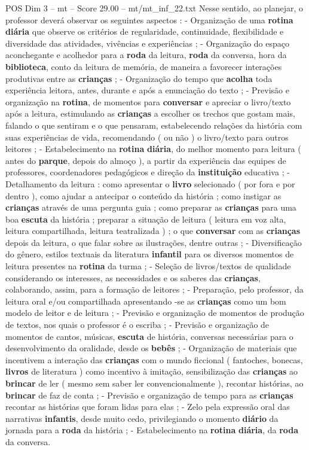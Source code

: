 \begin{textsample}{POS Dim 3 – mt – Score 29.00 – mt/mt\_inf\_22.txt}
Nesse sentido, ao planejar, o professor deverá observar os seguintes aspectos : - Organização de uma \textbf{rotina} \textbf{diária} que observe os critérios de regularidade, continuidade, flexibilidade e diversidade das atividades, vivências e experiências ; - Organização do espaço aconchegante e acolhedor para a \textbf{roda} da leitura, \textbf{roda} da conversa, hora da \textbf{biblioteca}, conto da leitura de memória, de maneira a favorecer interações produtivas entre as \textbf{crianças} ; - Organização do tempo que \textbf{acolha} toda experiência leitora, antes, durante e após a enunciação do texto ; - Previsão e organização na \textbf{rotina}, de momentos para \textbf{conversar} e apreciar o livro/texto após a leitura, estimulando as \textbf{crianças} a escolher os trechos que gostam mais, falando o que sentiram e o que pensaram, estabelecendo relações da história com suas experiências de vida, recomendando ( ou não ) o livro/texto para outros leitores ; - Estabelecimento na \textbf{rotina} \textbf{diária}, do melhor momento para leitura ( antes do \textbf{parque}, depois do almoço ), a partir da experiência das equipes de professores, coordenadores pedagógicos e direção da \textbf{instituição} educativa ; - Detalhamento da leitura : como apresentar o \textbf{livro} selecionado ( por fora e por dentro ), como ajudar a antecipar o conteúdo da história ; como instigar as \textbf{crianças} através de uma pergunta guia ; como preparar as \textbf{crianças} para uma boa \textbf{escuta} da história ; preparar a situação de leitura ( leitura em voz alta, leitura compartilhada, leitura teatralizada ) ; o que \textbf{conversar} com as \textbf{crianças} depois da leitura, o que falar sobre as ilustrações, dentre outras ; - Diversificação do gênero, estilos textuais da literatura \textbf{infantil} para os diversos momentos de leitura presentes na \textbf{rotina} da turma ; - Seleção de livros/textos de qualidade considerando os interesses, as necessidades e os saberes das \textbf{crianças}, colaborando, assim, para a formação de leitores ; - Preparação, pelo professor, da leitura oral e/ou compartilhada apresentando -se as \textbf{crianças} como um bom modelo de leitor e de leitura ; - Previsão e organização de momentos de produção de textos, nos quais o professor é o escriba ; - Previsão e organização de momentos de cantos, músicas, \textbf{escuta} de história, conversas necessárias para o desenvolvimento da oralidade, desde os \textbf{bebês} ; - Organização de materiais que incentivem a interação das \textbf{crianças} com o mundo ficcional ( fantoches, bonecas, \textbf{livros} de literatura ) como incentivo à imitação, sensibilização das \textbf{crianças} ao \textbf{brincar} de ler ( mesmo sem saber ler convencionalmente ), recontar histórias, ao \textbf{brincar} de faz de conta ; - Previsão e organização de tempo para as \textbf{crianças} recontar as histórias que foram lidas para elas ; - Zelo pela expressão oral das narrativas \textbf{infantis}, desde muito cedo, privilegiando o momento \textbf{diário} da jornada para a \textbf{roda} da história ; - Estabelecimento na \textbf{rotina} \textbf{diária}, da \textbf{roda} da conversa.

\end{textsample}
